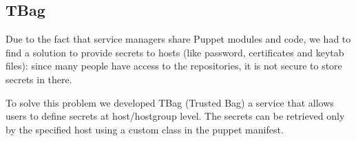 \subsection{TBag}

Due to the fact that service managers share Puppet modules and code, we
had to find a solution to provide secrets to hosts (like password,
certificates and keytab files): since many people have access to the
repositories, it is not secure to store secrets in there.

To solve this problem we developed TBag (Trusted Bag) a service that
allows users to define secrets at host/hostgroup level. The secrets can be
retrieved only by the specified host using a custom class in the puppet
manifest. 

